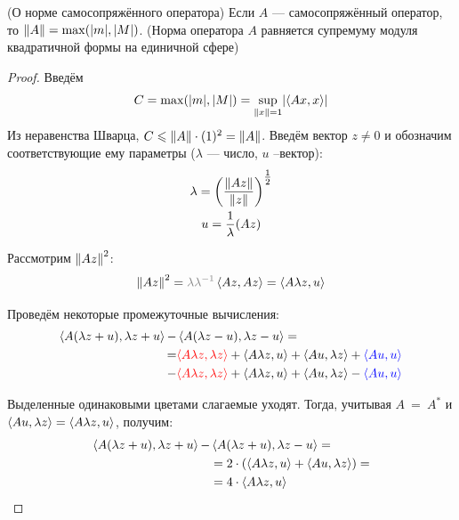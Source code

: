 \documentclass[12pt]{article}
\begin{document}
		\begin{state}
			(О норме самосопряжённого оператора) Если $A$ --- самосопряжённый оператор, то 
			$\left\| A \right\| = \max(|m|, |M|)$. 
			(Норма оператора $A$ равняется супремуму модуля квадратичной формы на единичной сфере)
		\end{state}
		\begin{proof}
			Введём 
			$$C = \max(|m|, |M|) = \underset{\left\| x \right\| = 1}{\sup} |\!\left\langle Ax, x \right\rangle\!|$$
			Из неравенства Шварца, $C \leqslant \left\| A \right\| \cdot (1)^2 = \left\| A \right\|$.
			Введём вектор $z \neq 0$ и обозначим соответствующие ему параметры ($\lambda$ --- число, $u$ --вектор):
			\begin{gather*}
				\lambda = \left(\frac{\left\| Az \right\|}{\left\| z \right\|}\right)^{\tfrac{1}{2}} \\
				u = \frac{1}{\lambda}(Az)
			\end{gather*}
		
			Рассмотрим $\left\| Az \right\|^2$:
			\begin{equation} \label{eq:scalprod}
				\norm{Az}^2 = {\color{gray} \lambda\lambda^{-1}} \scal{Az}{Az} = \scal{A \lambda z}{u}
			\end{equation}
		
			Проведём некоторые промежуточные вычисления:
			\begin{equation*}
			\begin{split}
				\left\langle A(\lambda z + u), \lambda z + u \right\rangle - &\left\langle A(\lambda z - u), \lambda z - u \right\rangle = \\
				  = &{\color{red}\left\langle A \lambda z, \lambda z \right\rangle} + \left\langle A\lambda z, u \right\rangle + \left\langle Au, \lambda z \right\rangle + {\color{blue}\left\langle Au, u \right\rangle} \\
				  - &{\color{red}\left\langle A \lambda z, \lambda z \right\rangle} + \left\langle A\lambda z, u \right\rangle + \left\langle Au, \lambda z \right\rangle - {\color{blue}\left\langle Au, u \right\rangle}
			\end{split}
			\end{equation*}
		
			Выделенные одинаковыми цветами слагаемые уходят. Тогда, учитывая $A~=~A^{*}$ и 
			$\left\langle Au, \lambda z \right\rangle = \left\langle A\lambda z, u \right\rangle$, получим:
			\begin{equation} \label{eq:scalproddiff}
			\begin{split}
				\left\langle A(\lambda z + u), \lambda z + u \right\rangle - &\left\langle A(\lambda z + u), \lambda z - u \right\rangle = \\
				 &= 2 \cdot \left(\left\langle A\lambda z, u \right\rangle + \left\langle Au, \lambda z \right\rangle\right) = \\
				 &= 4 \cdot \left\langle A\lambda z, u \right\rangle
			\end{split}
			\end{equation}
		

\end{proof}
\end{document}
